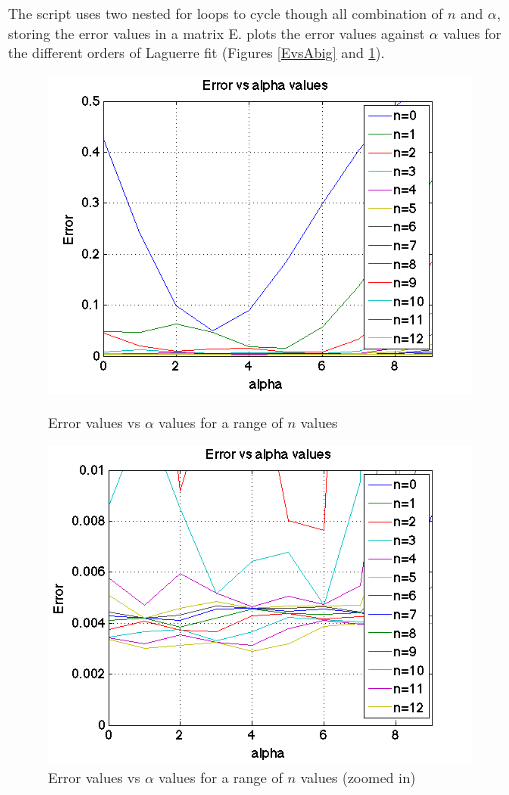 \documentclass{article}
\begin{document}
The script  uses two nested for loops to cycle though all combination of $n$ and $\alpha$, storing the error values in a matrix E.  plots the error values against $\alpha$ values for the different orders of Laguerre fit (Figures \ref{EvsAbig} and \ref{EvsAsmall}). 

\begin{figure}[h]
\centering
	\begin{minipage}[c][][b]{0.45\linewidth}
		\begin{center}
		\includegraphics[scale=0.35]{Matlab/FittingData/Graph/EvsAbig.png}  
		\end{center}
		\caption[b]{Error values vs $\alpha$ values for a range of $n$ values}
		\label{EvsAbig}
	\end{minipage}
\quad\quad\quad\quad
	\begin{minipage}[c][][b]{0.45\linewidth}
		\begin{center}
		\includegraphics[scale=0.35]{Matlab/FittingData/Graph/EvsAsmall.png}
		\end{center}
		\caption[b]{Error values vs $\alpha$ values for a range of $n$ values (zoomed in)}
		\label{EvsAsmall}
	\end{minipage}

\end{figure}
\end{document}
